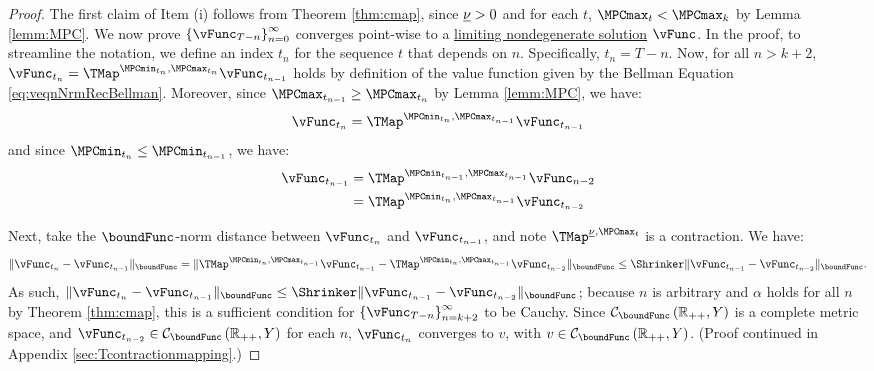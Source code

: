 \documentclass[BufferStockTheory]{subfiles}
\begin{document}
\begin{proof}

The first claim of Item (i) follows from Theorem \ref{thm:cmap}, since $\underline{\nu}>0$ and for each $t$, $\MPCmax_{t}< \MPCmax_{k}$ by Lemma \ref{lemm:MPC}. We now prove $\left\{\vFunc_{T-n}\right\}_{n=0}^{\infty}$ converges point-wise to a \hyperlink{Definition-of-a-Nondegenerate-Solution}{limiting nondegenerate solution} $\vFunc$. In the proof, to streamline the notation, we define an index $t_{n}$ for the sequence $t$ that depends on $n$. Specifically, $t_{n} = T - n$.  Now, for all $n>k+2$, $\vFunc_{t_{n}} = \TMap^{\MPCmin_{t_{n}}, \MPCmax_{t_{n}}}\vFunc_{t_{n-1}}$ holds by definition of the value function given by the Bellman Equation \eqref{eq:veqnNrmRecBellman}. Moreover, since $\MPCmax_{t_{n-1}}\geq \MPCmax_{t_{n}}$ by Lemma \ref{lemm:MPC}, we have:
%
\begin{equation*}
\vFunc_{t_{n}} = \TMap^{\MPCmin_{t_{n}}, \MPCmax_{t_{n-1}}}\vFunc_{t_{n-1}}
\end{equation*}
%
and since $\MPCmin_{t_{n}}\leq \MPCmin_{t_{n-1}}$, we have:
%
\begin{align*}
\vFunc_{t_{n-1}} &  = \TMap^{\MPCmin_{t_{n-1}}, \MPCmax_{t_{n-1}}}\vFunc_{n-2}\\ &  = \TMap^{\MPCmin_{t_{n}}, \MPCmax_{t_{n-1}}}\vFunc_{t_{n-2}} 
\end{align*}

Next, take the $\boundFunc$-norm distance between $\vFunc_{t_{n}}$ and $\vFunc_{t_{n-1}}$, and note  $\TMap^{\MPCminInf, \MPCmax_{t}}$ is a contraction. We have:
%
\begin{equation*}
\Vert\vFunc_{t_{n}} - \vFunc_{t_{n-1}}\Vert_{\boundFunc} = \Vert\TMap^{\MPCmin_{t_{n}}, \MPCmax_{t_{n-1}}}\vFunc_{t_{n-1}} - \TMap^{\MPCmin_{t_{n}}, \MPCmax_{t_{n-1}}}\vFunc_{t_{n-2}}\Vert_{\boundFunc} \leq \Shrinker \Vert \vFunc_{t_{n-1}} - \vFunc_{t_{n-2}}\Vert_{\boundFunc}. 
\end{equation*}
%
As such, $\Vert \vFunc_{t_{n}} - \vFunc_{t_{n-1}}\Vert_{\boundFunc } \leq \Shrinker \Vert \vFunc_{t_{n-1}} - \vFunc_{t_{n-2}}\Vert_{\boundFunc } $; because $n$ is arbitrary and $\alpha$ holds for all $n$ by Theorem \ref{thm:cmap}, this is a sufficient condition for  $\left\{\vFunc_{T-n}\right\}_{n=k+2}^{\infty}$ to be Cauchy. Since $\mathcal{C}_{\boundFunc }\left(\mathbb{R}_{++},Y\right) $ is a complete metric space, and $\vFunc_{t_{n-2}} \in \mathcal{C}_{\boundFunc }\left(\mathbb{R}_{++},Y\right)$ for each $n$, $\vFunc_{t_{n}}$ converges to $v$, with $v\in \mathcal{C}_{\boundFunc }\left(\mathbb{R}_{++},Y\right)$. (Proof continued in Appendix \ref{sec:Tcontractionmapping}.)
\end{proof}
\end{document}

